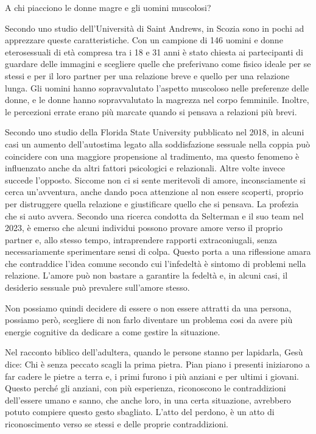 \documentclass[12pt]{book} %
\begin{document}
\begin{mdframed}[linewidth=1pt]
A chi piacciono le donne magre e gli uomini muscolosi?

Secondo uno studio dell'Università di Saint Andrews, in Scozia sono in pochi ad apprezzare queste caratteristiche. Con
un campione di 146 uomini e donne eterosessuali di età compresa tra i 18 e 31 anni è stato chiesta ai partecipanti di
guardare delle immagini e scegliere quelle che preferivano come fisico ideale per se stessi e per il loro partner per
una relazione breve e quello per una relazione lunga. Gli uomini hanno sopravvalutato l'aspetto muscoloso nelle
preferenze delle donne, e le donne hanno sopravvalutato la magrezza nel corpo femminile. Inoltre, le percezioni errate
erano più marcate quando si pensava a relazioni più brevi.
\end{mdframed}

Secondo uno studio della Florida State University pubblicato nel 2018, in alcuni casi un aumento dell'autostima legato alla soddisfazione sessuale nella coppia può coincidere con una maggiore propensione al tradimento, ma questo fenomeno è influenzato anche da altri fattori psicologici e relazionali. Altre volte invece succede l'opposto. Siccome non ci si sente meritevoli di amore,
inconsciamente si cerca un'avventura, anche dando poca attenzione al non essere scoperti, proprio
per distruggere quella relazione e giustificare quello che si pensava. La profezia che si auto avvera.
Secondo una ricerca condotta da Selterman e il suo team nel 2023, è emerso che alcuni individui possono provare amore verso il proprio partner e, allo stesso tempo, intraprendere rapporti extraconiugali, senza necessariamente sperimentare sensi di colpa. Questo porta a una riflessione amara che contraddice l'idea comune secondo cui l'infedeltà è sintomo di problemi nella relazione. L'amore può non bastare a garantire la fedeltà e, in alcuni casi, il desiderio sessuale può prevalere sull'amore stesso.

Non possiamo quindi decidere di essere o non essere attratti da una persona, possiamo però, scegliere di non farlo
diventare un problema cosi da avere più energie cognitive da dedicare a come gestire la situazione.

Nel racconto biblico dell'adultera, quando le persone stanno per lapidarla, Gesù dice: Chi è senza peccato scagli la
prima pietra. Pian piano i presenti iniziarono a far cadere le pietre a terra e, i primi furono i più anziani e per
ultimi i giovani. Questo perché gli anziani, con più esperienza, riconoscono le contraddizioni
dell'essere umano e sanno, che anche loro, in una certa situazione, avrebbero potuto compiere
questo gesto sbagliato. L'atto del perdono, è un atto di riconoscimento verso se stessi e delle proprie contraddizioni.
\end{document}
